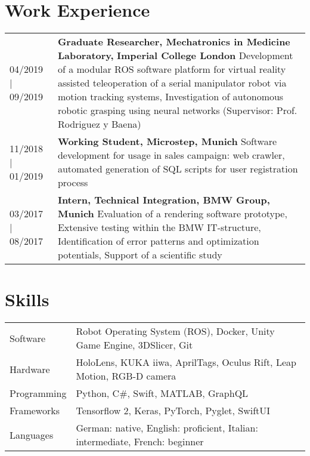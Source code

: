 \documentclass{article}
\begin{document}
\section*{Work Experience}
\begin{tabularx}{\textwidth}{@{}lX}

04/2019 | 09/2019 &  \textbf{Graduate Researcher, Mechatronics in Medicine Laboratory, } \newline 
					 \textbf{Imperial College London} \newline
					 Development of a modular ROS software platform for virtual reality assisted teleoperation of a serial manipulator robot via motion tracking systems, Investigation of autonomous robotic grasping using neural networks (Supervisor: Prof. Rodriguez y Baena) \\
11/2018 | 01/2019 &  \textbf{Working Student, Microstep, Munich} \newline
                  	 Software development for usage in sales campaign: web crawler, automated generation of SQL scripts for user registration process \\
03/2017 | 08/2017 &  \textbf{Intern, Technical Integration, BMW Group, Munich} \newline
                  	 Evaluation of a rendering software prototype, Extensive testing within the BMW IT-structure, Identification of error patterns and optimization potentials, Support of a scientific study \\
\end{tabularx}

\section*{Skills}
\begin{tabularx}{\textwidth}{@{}lX}

Software &  Robot Operating System (ROS), Docker, Unity Game Engine, 3DSlicer, Git \\
Hardware & HoloLens, KUKA iiwa, AprilTags, Oculus Rift, Leap Motion, RGB-D camera \\
Programming & Python, C\#, Swift, MATLAB, GraphQL  \\
Frameworks & Tensorflow 2, Keras, PyTorch, Pyglet, SwiftUI \\
Languages & German: native, English: proficient, Italian: intermediate, French: beginner 
\end{tabularx}
\end{document}
